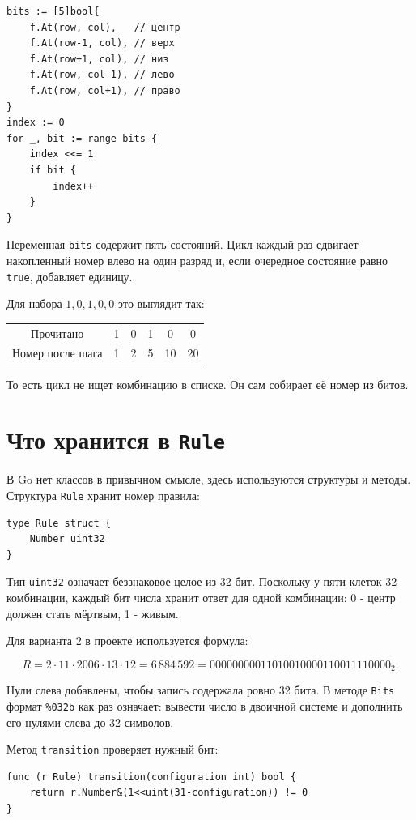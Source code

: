 \documentclass[12pt,a4paper]{article}
\newcommand{\code}[1]{\texttt{#1}}
\newcommand{\sectiontitle}[1]{\section{\color{ink}#1}}
\begin{document}
\begin{lstlisting}[style=gostyle]
bits := [5]bool{
    f.At(row, col),   // центр
    f.At(row-1, col), // верх
    f.At(row+1, col), // низ
    f.At(row, col-1), // лево
    f.At(row, col+1), // право
}
index := 0
for _, bit := range bits {
    index <<= 1
    if bit {
        index++
    }
}
\end{lstlisting}

Переменная \code{bits} содержит пять состояний. Цикл каждый раз сдвигает
накопленный номер влево на один разряд и, если очередное состояние равно
\code{true}, добавляет единицу.

Для набора $1,0,1,0,0$ это выглядит так:

\begin{center}
\begin{tabular}{c|ccccc}
  Прочитано & 1 & 0 & 1 & 0 & 0 \\
  Номер после шага & 1 & 2 & 5 & 10 & 20 \\
\end{tabular}
\end{center}

То есть цикл не ищет комбинацию в списке. Он сам собирает её номер из битов.

\sectiontitle{Что хранится в \code{Rule}}

В Go нет классов в привычном смысле, здесь используются структуры и методы.
Структура \code{Rule} хранит номер правила:

\begin{lstlisting}[style=gostyle]
type Rule struct {
    Number uint32
}
\end{lstlisting}

Тип \code{uint32} означает беззнаковое целое из 32 бит. Поскольку у пяти
клеток 32 комбинации, каждый бит числа хранит ответ для одной комбинации:
0 - центр должен стать мёртвым, 1 - живым.

Для варианта 2 в проекте используется формула:

\[
R = 2 \cdot 11 \cdot 2006 \cdot 13 \cdot 12
  = 6\,884\,592
  = 00000000011010010000110011110000_2.
\]

Нули слева добавлены, чтобы запись содержала ровно 32 бита. В методе
\code{Bits} формат \code{\%032b} как раз означает: вывести число в двоичной
системе и дополнить его нулями слева до 32 символов.

Метод \code{transition} проверяет нужный бит:

\begin{lstlisting}[style=gostyle]
func (r Rule) transition(configuration int) bool {
    return r.Number&(1<<uint(31-configuration)) != 0
}
\end{lstlisting}
\end{document}
